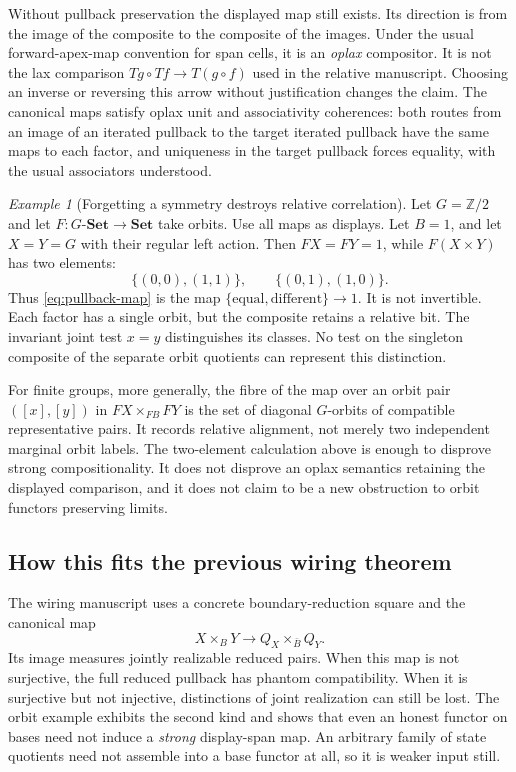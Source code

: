 \documentclass[11pt]{article}
\theoremstyle{definition}\newtheorem{definition}[theorem]{Definition}
\theoremstyle{remark}\newtheorem{remark}[theorem]{Remark}
\newtheorem{example}[theorem]{Example}
\newcommand{\Set}{\mathbf{Set}}
\begin{document}
Without pullback preservation the displayed map still exists. Its direction
is from the image of the composite to the composite of the images. Under the
usual forward-apex-map convention for span cells, it is an \emph{oplax}
compositor. It is not the lax comparison
$Tg\circ Tf\to T(g\circ f)$ used in the relative manuscript. Choosing an
inverse or reversing this arrow without justification changes the claim.
The canonical maps satisfy oplax unit and associativity coherences: both
routes from an image of an iterated pullback to the target iterated pullback
have the same maps to each factor, and uniqueness in the target pullback
forces equality, with the usual associators understood.

\begin{example}[Forgetting a symmetry destroys relative correlation]
Let $G=\mathbb Z/2$ and let $F:G\text{-}\Set\to\Set$ take orbits.
Use all maps as displays. Let $B=1$, and let $X=Y=G$ with their regular
left action. Then $FX=FY=1$, while $F(X\times Y)$ has two elements:
\[
 \{(0,0),(1,1)\},\qquad \{(0,1),(1,0)\}.
\]
Thus \eqref{eq:pullback-map} is the map $\{\text{equal},\text{different}\}\to1$.
It is not invertible. Each factor has a single orbit, but the composite
retains a relative bit. The invariant joint test $x=y$ distinguishes its
classes. No test on the singleton composite of the separate orbit quotients
can represent this distinction.

For finite groups, more generally, the fibre of the map over an orbit pair
$([x],[y])$ in $FX\times_{FB}FY$ is the set of diagonal $G$-orbits of
compatible representative pairs. It records relative alignment, not merely
two independent marginal orbit labels. The two-element calculation above
is enough to disprove strong compositionality. It does not disprove an
oplax semantics retaining the displayed comparison, and it does not claim
to be a new obstruction to orbit functors preserving limits.
\end{example}

\subsection{How this fits the previous wiring theorem}
The wiring manuscript \cite{Wiring} uses a concrete boundary-reduction square
and the canonical map
\[
 X\times_BY\longrightarrow Q_X\times_{\bar B}Q_Y.
\]
Its image measures jointly realizable reduced pairs. When this map is not
surjective, the full reduced pullback has phantom compatibility. When it is
surjective but not injective, distinctions of joint realization can still be
lost. The orbit example exhibits the second kind and shows that even an
honest functor on bases need not induce a \emph{strong} display-span map.
An arbitrary family of state quotients need not assemble into a base functor
at all, so it is weaker input still.
\end{document}
